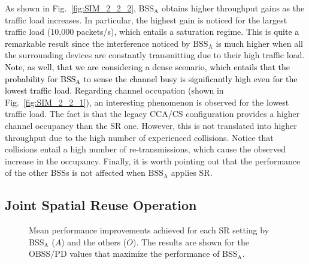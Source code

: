 \documentclass[preprint,12pt]{elsarticle}
\begin{document}
As shown in Fig.~\ref{fig:SIM_2_2_2}, $\text{BSS}_\text{A}$ obtains higher throughput gains as the traffic load increases. In particular, the highest gain is noticed for the largest traffic load (10,000 packets/s), which entails a saturation regime. This is \textcolor{black}{quite a} remarkable result since the interference noticed by $\text{BSS}_\text{A}$ is much higher when all the surrounding devices are constantly transmitting due to their high traffic load. \textcolor{black}{Note, as well, that we are considering a dense scenario, which entails that the probability for BSS$_\text{A}$ to sense the channel busy is significantly high even for the lowest traffic load.} Regarding channel occupation (shown in Fig.~\ref{fig:SIM_2_2_1}), an interesting phenomenon is observed for the lowest traffic load. The fact is that the legacy CCA/CS configuration provides a higher channel occupancy than the SR one. However, this is not translated into higher throughput due to the high number of experienced collisions. Notice that collisions entail a high number of re-transmissions, which cause the observed increase in the occupancy. Finally, it is worth pointing out that the performance of the other BSSs is not affected when $\text{BSS}_\text{A}$ applies SR.

\subsection{Joint Spatial Reuse Operation}
\label{section:random_scenarios_collaborative}

\begin{figure}[ht!]
	\centering		
	\caption{Mean performance improvements achieved for each SR setting by BSS$_\text{A}$ ($A$) and the others ($O$). The results are shown for the OBSS/PD values that maximize the performance of BSS$_\text{A}$.}\label{fig:SIM_2_3}
\end{figure}
\end{document}
